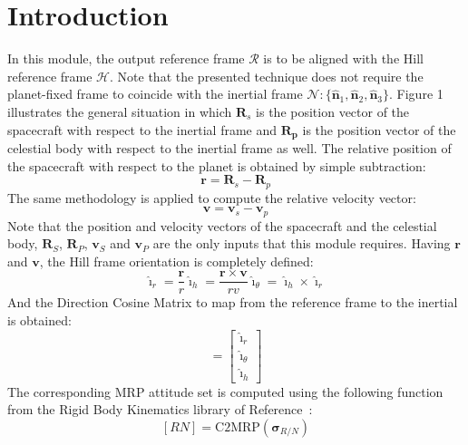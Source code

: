 \documentclass[]{AVSSimReportMemo}
\begin{document}
\section{Introduction}
In this module, the output reference frame $\mathcal{R}$ is to be aligned with the Hill reference frame $\mathcal{H}$. Note that the presented technique does not require the planet-fixed  frame to coincide with the inertial frame $\mathcal{N}:\{ \hat{\bm n}_{1}, \hat{\bm n}_{2}, \hat{\bm n}_{3} \}$. Figure 1 illustrates the general situation in which $\bm{R}_{s}$ is the position vector of the spacecraft with respect to the inertial frame and $\bm{R_{p}}$ is the position vector of the  celestial body with respect to the inertial frame as well.
The relative position of the spacecraft with respect to the planet is obtained by simple subtraction:
\begin{equation}
	\label{eq:r}
	\bm r = \bm R_{s} -  \bm R_{p}
\end{equation}
The same methodology is applied to compute the relative velocity vector:
\begin{equation}
	\label{eq:v}
	\bm v = \bm v_{s} -  \bm v_{p}
\end{equation}
Note that the position and velocity vectors of the spacecraft and the celestial body, $\bm{R}_S$,  $\bm{R}_P$,  $\bm{v}_S$ and  $\bm{v}_P$ are the only inputs that this module requires. Having $\bm r$ and $\bm v$, the Hill frame orientation is completely defined:
\begin{subequations}
	\begin{equation}
	\hat{\bm\imath}_{r} = \frac{\bm r}{r}
	\end{equation}
	\begin{equation}
	\hat{\bm\imath}_{h} = \frac{\bm{r}\times{\bm{v}}}{r v}
	\end{equation}
	\begin{equation}
	\hat{\bm\imath}_{\theta} = \hat{\bm\imath}_{h} \times \hat{\bm\imath}_{r}
	\end{equation}
\end{subequations}
And the Direction Cosine Matrix to map from the reference frame to the inertial is obtained:
\begin{equation}
	[RN] =  \begin{bmatrix}
       		\hat{\bm\imath}_{r} \\
		\hat{\bm\imath}_{\theta} \\
		\hat{\bm\imath}_{h}
      \end{bmatrix}
\end{equation}
The corresponding MRP attitude set is computed using the following function from the Rigid Body Kinematics library of Reference~:
$$ [RN] = \textrm{C2MRP}(\bm\sigma_{R/N})$$
\end{document}
